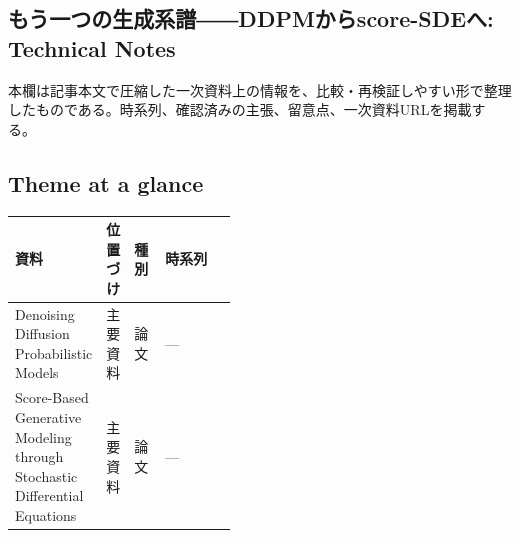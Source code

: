 \subsection*{もう一つの生成系譜――DDPMからscore-SDEへ: Technical Notes}
本欄は記事本文で圧縮した一次資料上の情報を、比較・再検証しやすい形で整理したものである。時系列、確認済みの主張、留意点、一次資料URLを掲載する。
\smallskip
{}\par
\medskip
\subsection*{Theme at a glance}
\begin{center}
\footnotesize
\begin{tabularx}{\linewidth}{@{}p{0.20\linewidth}p{0.10\linewidth}p{0.14\linewidth}X@{}}
\toprule
資料 & 位置づけ & 種別 & 時系列 \\
\midrule
Denoising Diffusion Probabilistic Models & 主要資料 & 論文 & — \\
Score-Based Generative Modeling through Stochastic Differential Equations & 主要資料 & 論文 & — \\
\bottomrule
\end{tabularx}
\end{center}
\normalsize

